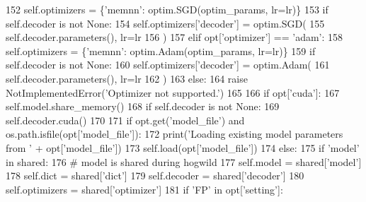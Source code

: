 \begin{DoxyCode}
152                 self.optimizers = \{\textcolor{stringliteral}{'memnn'}: optim.SGD(optim\_params, lr=lr)\}
153                 \textcolor{keywordflow}{if} self.decoder \textcolor{keywordflow}{is} \textcolor{keywordflow}{not} \textcolor{keywordtype}{None}:
154                     self.optimizers[\textcolor{stringliteral}{'decoder'}] = optim.SGD(
155                         self.decoder.parameters(), lr=lr
156                     )
157             \textcolor{keywordflow}{elif} opt[\textcolor{stringliteral}{'optimizer'}] == \textcolor{stringliteral}{'adam'}:
158                 self.optimizers = \{\textcolor{stringliteral}{'memnn'}: optim.Adam(optim\_params, lr=lr)\}
159                 \textcolor{keywordflow}{if} self.decoder \textcolor{keywordflow}{is} \textcolor{keywordflow}{not} \textcolor{keywordtype}{None}:
160                     self.optimizers[\textcolor{stringliteral}{'decoder'}] = optim.Adam(
161                         self.decoder.parameters(), lr=lr
162                     )
163             \textcolor{keywordflow}{else}:
164                 \textcolor{keywordflow}{raise} NotImplementedError(\textcolor{stringliteral}{'Optimizer not supported.'})
165 
166             \textcolor{keywordflow}{if} opt[\textcolor{stringliteral}{'cuda'}]:
167                 self.model.share\_memory()
168                 \textcolor{keywordflow}{if} self.decoder \textcolor{keywordflow}{is} \textcolor{keywordflow}{not} \textcolor{keywordtype}{None}:
169                     self.decoder.cuda()
170 
171             \textcolor{keywordflow}{if} opt.get(\textcolor{stringliteral}{'model\_file'}) \textcolor{keywordflow}{and} os.path.isfile(opt[\textcolor{stringliteral}{'model\_file'}]):
172                 print(\textcolor{stringliteral}{'Loading existing model parameters from '} + opt[\textcolor{stringliteral}{'model\_file'}])
173                 self.load(opt[\textcolor{stringliteral}{'model\_file'}])
174         \textcolor{keywordflow}{else}:
175             \textcolor{keywordflow}{if} \textcolor{stringliteral}{'model'} \textcolor{keywordflow}{in} shared:
176                 \textcolor{comment}{# model is shared during hogwild}
177                 self.model = shared[\textcolor{stringliteral}{'model'}]
178                 self.dict = shared[\textcolor{stringliteral}{'dict'}]
179                 self.decoder = shared[\textcolor{stringliteral}{'decoder'}]
180                 self.optimizers = shared[\textcolor{stringliteral}{'optimizer'}]
181                 \textcolor{keywordflow}{if} \textcolor{stringliteral}{'FP'} \textcolor{keywordflow}{in} opt[\textcolor{stringliteral}{'setting'}]:

\end{DoxyCode}
